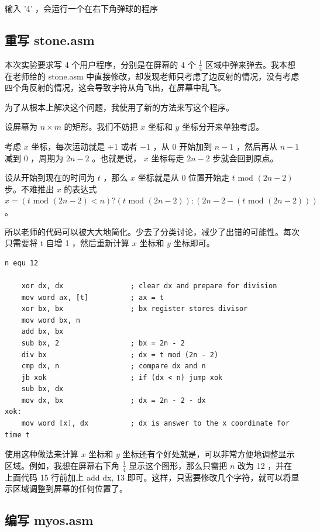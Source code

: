 \documentclass{article}
\begin{document}
输入 '4' ，会运行一个在右下角弹球的程序


\subsection{重写 stone.asm }

本次实验要求写 4 个用户程序，分别是在屏幕的 4 个 $\frac{1}{4}$ 区域中弹来弹去。我本想在老师给的 stone.asm 中直接修改，却发现老师只考虑了边反射的情况，没有考虑四个角反射的情况，这会导致字符从角飞出，在屏幕中乱飞。

为了从根本上解决这个问题，我使用了新的方法来写这个程序。

设屏幕为 $n \times m$ 的矩形。我们不妨把 $x$ 坐标和 $y$ 坐标分开来单独考虑。

考虑 $x$ 坐标，每次运动就是 $+1$ 或者 $-1$ ，从 $0$ 开始加到 $n - 1$ ，然后再从 $n - 1$ 减到 $0$ ，周期为 $2n - 2$ 。也就是说， $x$ 坐标每走 $2n - 2$ 步就会回到原点。

设从开始到现在的时间为 $t$ ，那么 $x$ 坐标就是从 $0$ 位置开始走 $t \text{ mod } (2n - 2)$ 步。不难推出 $x$ 的表达式 $x = (t \text{ mod }(2n - 2) < n) ? (t \text{ mod }(2n - 2)) : (2n - 2 - (t \text{ mod }(2n - 2)))$ 。

所以老师的代码可以被大大地简化。少去了分类讨论，减少了出错的可能性。每次只需要将 t 自增 1 ，然后重新计算 $x$ 坐标和 $y$ 坐标即可。

\begin{lstlisting}[language={[x86masm]Assembler}]
	n equ 12

	xor dx, dx                ; clear dx and prepare for division
	mov word ax, [t]          ; ax = t
	xor bx, bx                ; bx register stores divisor
	mov word bx, n
	add bx, bx
	sub bx, 2                 ; bx = 2n - 2
	div bx                    ; dx = t mod (2n - 2)
	cmp dx, n                 ; compare dx and n
	jb xok                    ; if (dx < n) jump xok
	sub bx, dx
	mov dx, bx                ; dx = 2n - 2 - dx
xok:
	mov word [x], dx          ; dx is answer to the x coordinate for time t
\end{lstlisting}

使用这种做法来计算 $x$ 坐标和 $y$ 坐标还有个好处就是，可以非常方便地调整显示区域。例如，我想在屏幕右下角 $\frac{1}{4}$ 显示这个图形，那么只需把 $n$ 改为 12 ，并在上面代码 15 行前加上 add dx, 13 即可。这样，只需要修改几个字符，就可以将显示区域调整到屏幕的任何位置了。

\subsection{编写 myos.asm }
\end{document}
